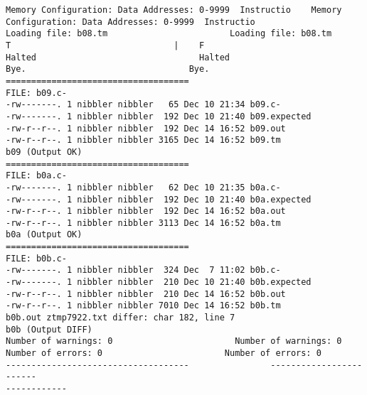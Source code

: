 \documentclass[12pt]{book}
\begin{document}
\begin{lstlisting}
Memory Configuration: Data Addresses: 0-9999  Instructio    Memory 
Configuration: Data Addresses: 0-9999  Instructio
Loading file: b08.tm                        Loading file: b08.tm
T                                |    F 
Halted                                Halted
Bye.                                Bye.
====================================
FILE: b09.c-
-rw-------. 1 nibbler nibbler   65 Dec 10 21:34 b09.c-
-rw-------. 1 nibbler nibbler  192 Dec 10 21:40 b09.expected
-rw-r--r--. 1 nibbler nibbler  192 Dec 14 16:52 b09.out
-rw-r--r--. 1 nibbler nibbler 3165 Dec 14 16:52 b09.tm
b09 (Output OK)
====================================
FILE: b0a.c-
-rw-------. 1 nibbler nibbler   62 Dec 10 21:35 b0a.c-
-rw-------. 1 nibbler nibbler  192 Dec 10 21:40 b0a.expected
-rw-r--r--. 1 nibbler nibbler  192 Dec 14 16:52 b0a.out
-rw-r--r--. 1 nibbler nibbler 3113 Dec 14 16:52 b0a.tm
b0a (Output OK)
====================================
FILE: b0b.c-
-rw-------. 1 nibbler nibbler  324 Dec  7 11:02 b0b.c-
-rw-------. 1 nibbler nibbler  210 Dec 10 21:40 b0b.expected
-rw-r--r--. 1 nibbler nibbler  210 Dec 14 16:52 b0b.out
-rw-r--r--. 1 nibbler nibbler 7010 Dec 14 16:52 b0b.tm
b0b.out ztmp7922.txt differ: char 182, line 7
b0b (Output DIFF)
Number of warnings: 0                        Number of warnings: 0
Number of errors: 0                        Number of errors: 0
------------------------------------                ------------------------
------------


\end{lstlisting}
\end{document}

